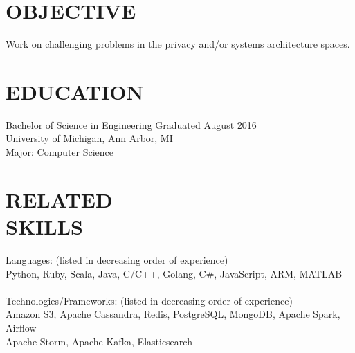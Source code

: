 \documentclass[line,margin]{res}
\begin{document}

\color{HeaderColor}
\address{\hfill riizade@gmail.com -- github.com/riizade -- 248-716-5054}

 
 \renewcommand{\labelitemi}{$-$}
 
\begin{resume}
\color{black}
\section{\textcolor{HeaderColor}{OBJECTIVE}}
				Work on challenging problems in the privacy and/or systems architecture spaces.

\section{\textcolor{HeaderColor}{EDUCATION}} {\sc Bachelor of Science in Engineering} \hfill Graduated August 2016\\
				University of Michigan, Ann Arbor, MI \\
                Major: Computer Science 
 
\section{\textcolor{HeaderColor}{RELATED \\ SKILLS}} 
				{\sc Languages: (listed in decreasing order of experience)} \\
				Python, Ruby, Scala, Java, C/C++, Golang, C\#, JavaScript, ARM, MATLAB\\
\\
				{\sc Technologies/Frameworks: (listed in decreasing order of experience)} \\
				Amazon S3, Apache Cassandra, Redis, PostgreSQL, MongoDB, Apache Spark, Airflow \\ Apache Storm, Apache Kafka, Elasticsearch
 

\end{resume}
\end{document}
